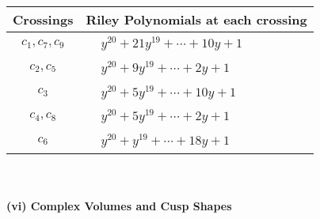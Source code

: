 \documentclass[1p]{elsarticle_modified}
\theoremstyle{definition}
\begin{document}
\begin{tabular}{m{50pt}|m{274pt}}
Crossings & \hspace{64pt}Riley Polynomials at each crossing \\
\hline $$\begin{aligned}c_{1},c_{7},c_{9}\end{aligned}$$&$\begin{aligned}
&y^{20}+21 y^{19}+\cdots+10 y+1
\end{aligned}$\\
\hline $$\begin{aligned}c_{2},c_{5}\end{aligned}$$&$\begin{aligned}
&y^{20}+9 y^{19}+\cdots+2 y+1
\end{aligned}$\\
\hline $$\begin{aligned}c_{3}\end{aligned}$$&$\begin{aligned}
&y^{20}+5 y^{19}+\cdots+10 y+1
\end{aligned}$\\
\hline $$\begin{aligned}c_{4},c_{8}\end{aligned}$$&$\begin{aligned}
&y^{20}+5 y^{19}+\cdots+2 y+1
\end{aligned}$\\
\hline $$\begin{aligned}c_{6}\end{aligned}$$&$\begin{aligned}
&y^{20}+y^{19}+\cdots+18 y+1
\end{aligned}$\\
\hline
\end{tabular}\\~\\
\newpage\flushleft \textbf{(vi) Complex Volumes and Cusp Shapes}
\end{document}
